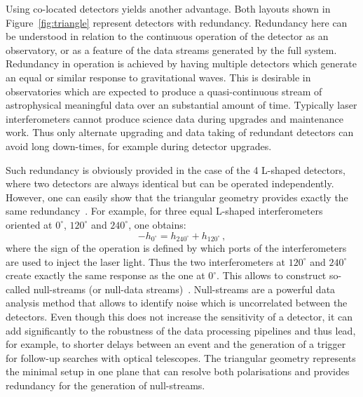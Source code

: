 Using co-located detectors yields another advantage. Both layouts shown in Figure~\ref{fig:triangle} represent
detectors with redundancy. Redundancy here can be understood in relation to the continuous operation of the
detector as an observatory, or as a feature of the data streams generated by the full system. Redundancy in operation
is achieved by having multiple detectors which generate an equal or similar response to gravitational waves.
This is desirable in observatories which are expected to produce a quasi-continuous stream of astrophysical meaningful
data over an substantial amount of time. Typically laser interferometers cannot produce science data during
upgrades and maintenance work. Thus only alternate upgrading and data taking of redundant detectors can
avoid long down-times, for example during detector upgrades.

Such redundancy is obviously provided in the case of the 4 L-shaped  detectors, where two detectors are
always identical but can be operated independently. However, one can easily show that the triangular geometry
provides exactly the same redundancy~\cite{Freise09}. For example, for three equal L-shaped interferometers
oriented at $0^\circ$, $120^\circ$ and $240^\circ$, one obtains:
\begin{equation}
-h_{0^\circ}= h_{240^\circ}+h_{120^\circ}\,,
\end{equation}
where the sign of the operation is defined by which ports of the interferometers
are used to inject the laser light. Thus the two interferometers at $120^\circ$ and $240^\circ$
create exactly the same response as the one at $0^\circ$. This allows to construct
so-called null-streams (or null-data streams)~\cite{GurselTinto1989}. Null-streams are a powerful
data analysis method that allows to identify noise which is uncorrelated between the
detectors. Even though this does not increase the sensitivity of a detector,
it can add significantly to the robustness of the data processing pipelines and thus lead, for example, to shorter
delays between an event and the generation of a trigger for follow-up searches with optical telescopes.
The triangular geometry represents the minimal setup in one plane that can resolve both polarisations
and provides redundancy for the generation of null-streams.


